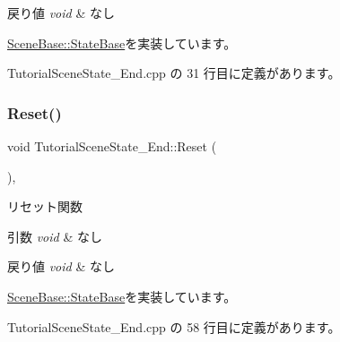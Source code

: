 \begin{DoxyRetVals}{戻り値}
{\em void} & なし \\
\hline
\end{DoxyRetVals}


\mbox{\hyperlink{class_scene_base_1_1_state_base_a33350231b039a2178c19beac0211c5b8}{Scene\+Base\+::\+State\+Base}}を実装しています。



 Tutorial\+Scene\+State\+\_\+\+End.\+cpp の 31 行目に定義があります。

\mbox{\label{class_tutorial_scene_state___end_ada1a87235a021b40f8eca96e31879227}} 
\subsubsection{\texorpdfstring{Reset()}{Reset()}}
{\footnotesize\ttfamily void Tutorial\+Scene\+State\+\_\+\+End\+::\+Reset (\begin{DoxyParamCaption}{ }\end{DoxyParamCaption})\hspace{0.3cm}{\ttfamily [override]}, {\ttfamily [virtual]}}



リセット関数 


\begin{DoxyParams}{引数}
{\em void} & なし \\
\hline
\end{DoxyParams}

\begin{DoxyRetVals}{戻り値}
{\em void} & なし \\
\hline
\end{DoxyRetVals}


\mbox{\hyperlink{class_scene_base_1_1_state_base_a2e14a3afece0b1d8db9edcebf514a977}{Scene\+Base\+::\+State\+Base}}を実装しています。



 Tutorial\+Scene\+State\+\_\+\+End.\+cpp の 58 行目に定義があります。

\mbox{\label{class_tutorial_scene_state___end_aafc0d8d042de8c7f79d84fcdc35a807c}} 
